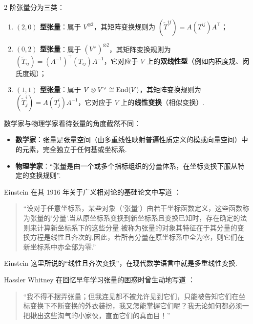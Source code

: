 \begin{example}\label{ex:rank2-tensor-physics}
$2$ 阶张量分为三类：
\begin{enumerate}
  \item \textbf{$(2, 0)$ 型张量}：属于 $V^{\otimes 2}$，其矩阵变换规则为 $(\widetilde{T}^{ij}) = A (T^{ij}) A^\top$；
  \item \textbf{$(0, 2)$ 型张量}：属于 $(V^\vee)^{\otimes 2}$，其矩阵变换规则为 $(\widetilde{T}_{ij}) = (A^{-1})^\top (T_{ij}) A^{-1}$，它对应于 $V$ 上的\textbf{双线性型}（例如内积度规、闵氏度规）；
  \item \textbf{$(1, 1)$ 型张量}：属于 $V \otimes V^\vee \cong \operatorname{End}(V)$，其矩阵变换规则为 $(\widetilde{T}^i_j) = A (T^i_j) A^{-1}$，它对应于 $V$ 上的\textbf{线性变换}（相似变换）.
\end{enumerate}
\end{example}

\begin{remark}\label{rem:einstein-quote}
数学家与物理学家看待张量的角度截然不同：
\begin{itemize}
  \item \textbf{数学家}：张量是张量空间（由多重线性映射普遍性质定义的模或向量空间）中的元素，完全独立于任何基或坐标系.
  \item \textbf{物理学家}：``张量是由一个或多个指标组织的分量体系，在坐标变换下服从特定的变换规则''\cite{feynman-lectures}.
\end{itemize}

Einstein 在其 1916 年关于广义相对论的基础论文中写道 \cite[第~157~页]{einstein-gr}：
\begin{quote}
``设对于任意坐标系，某些对象（'张量'）由若干坐标函数定义，这些函数称为张量的'分量'.当从原坐标系变换到新坐标系且变换已知时，存在确定的法则来计算新坐标系下的这些分量.被称为张量的对象其特征在于其分量的变换方程是线性且齐次的.因此，若所有分量在原坐标系中全为零，则它们在新坐标系中亦全部为零.''
\end{quote}
Einstein 这里所说的``线性且齐次变换''，在现代数学语言中就是多重线性变换.

Hassler Whitney 在回忆早年学习张量的困惑时曾生动地写道 \cite[第~114~页]{whitney-history}：
\begin{quote}
``我不得不摆弄张量；但我连见都不被允许见到它们，只能被告知它们在坐标变换下不断变换的外衣装扮，我又怎能掌握它们呢？我无论如何都必须一把揪出这些淘气的小家伙，直面它们的真面目！''
\end{quote}
\end{remark}


